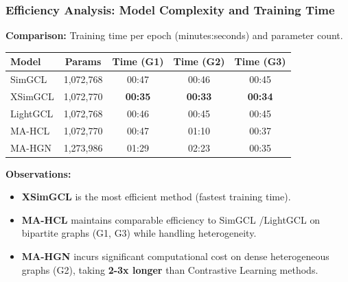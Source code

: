 \documentclass{beamer}
\begin{document}
\begin{frame}
    \frametitle{Efficiency Analysis: Model Complexity and Training Time}
    \textbf{Comparison:} Training time per epoch (minutes:seconds) and parameter count.

    \begin{table}
        \centering
        \small
        \setlength{\tabcolsep}{4pt}
        \renewcommand{\arraystretch}{1.1}
        \begin{tabular}{l|c|ccc}
            \toprule
            \textbf{Model} & \textbf{Params} & \textbf{Time (G1)} & \textbf{Time (G2)} & \textbf{Time (G3)} \\
            \midrule

            SimGCL         & 1,072,768       & 00:47              & 00:46              & 00:45              \\
            XSimGCL        & 1,072,770       & \textbf{00:35}     & \textbf{00:33}     & \textbf{00:34}     \\
            LightGCL       & 1,072,768       & 00:46              & 00:45              & 00:45              \\
            \midrule
            MA-HCL         & 1,072,770       & 00:47              & 01:10              & 00:37              \\
            MA-HGN         & 1,273,986       & 01:29              & 02:23              & 00:35              \\
            \bottomrule
        \end{tabular}
    \end{table}

    \vspace{0.2cm}
    \textbf{Observations:}
    \begin{itemize}
        \item \textbf{XSimGCL} is the most efficient method (fastest training time).
        \item \textbf{MA-HCL} maintains comparable efficiency to SimGCL \cite{yu2022graph}/LightGCL \cite{cai2023lightgcl} on bipartite graphs (G1, G3) while handling heterogeneity.
        \item \textbf{MA-HGN} incurs significant computational cost on dense heterogeneous graphs (G2), taking \textbf{2-3x longer} than Contrastive Learning methods.
    \end{itemize}
\end{frame}
\end{document}
